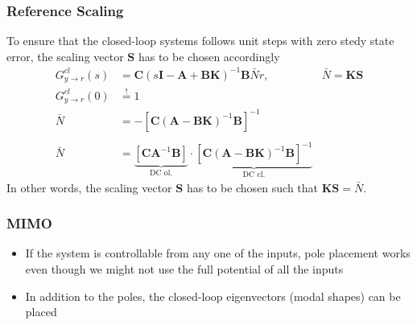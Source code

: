 \subsubsection{Reference Scaling}
To ensure that the closed-loop systems follows unit steps with zero stedy state error, the scaling vector $\mathbf{S}$ has to be chosen accordingly
\noindent\begin{align*}
    G_{y\rightarrow r}^{cl}(s) & =\mathbf{C}{(s\mathbf{I}-\mathbf{A}+\mathbf{BK})}^{-1}\mathbf{B}\bar{N}r,                                                                                                      & \bar{N}=\mathbf{KS} \\
    G_{y\rightarrow r}^{cl}(0) & \overset{!}{=} 1                                                                                                                                                                                     \\
    \bar{N}                    & =-{\left[\mathbf{C}{(\mathbf{A}-\mathbf{BK})}^{-1}\mathbf{B}\right]}^{-1}                                                                                                                            \\\\
    \bar{N}                    & =\underbrace{\left[\mathbf{CA}^{-1}\mathbf{B}\right]}_{\text{DC ol.}}\cdot\underbrace{{\left[\mathbf{C}{(\mathbf{A}-\mathbf{BK})}^{-1}\mathbf{B}\right]}^{-1}}_{\text{DC cl.}}
\end{align*}
In other words, the scaling vector $\mathbf{S}$ has to be chosen such that $\mathbf{KS}=\bar{N}$.

\subsubsection{MIMO}
\begin{itemize}
    \item If the system is controllable from any one of the inputs, pole placement works even though we might not use the full potential of all the inputs
    \item In addition to the poles, the closed-loop eigenvectors (modal shapes) can be placed
\end{itemize}